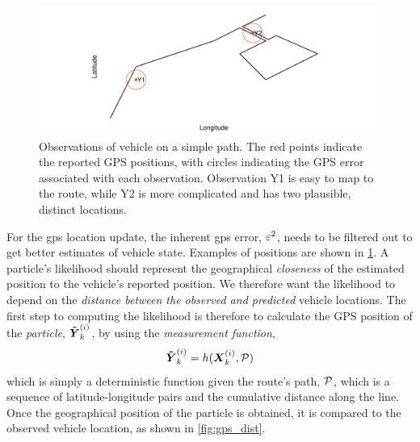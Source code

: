 \begin{knitrout}
\color{fgcolor}\begin{figure}
\includegraphics[width=\maxwidth]{figure/lhood_obs-1} \caption[Observations of vehicle on a simple path]{Observations of vehicle on a simple path. The red points indicate the reported GPS positions, with circles indicating the GPS error associated with each observation. Observation Y1 is easy to map to the route, while Y2 is more complicated and has two plausible, distinct locations.}\label{fig:lhood_obs}
\end{figure}


\end{knitrout}





For the \gls{gps} location update, the inherent \gls{gps} error, $\varepsilon^2$, needs to be filtered out to get better estimates of vehicle state. Examples of positions are shown in \cref{fig:lhood_obs}. A particle's likelihood should represent the geographical \emph{closeness} of the estimated position to the vehicle's reported position. We therefore want the likelihood to depend on the \emph{distance between the observed and predicted} vehicle locations. The first step to computing the likelihood is therefore
to calculate the GPS position of the \emph{particle}, $\boldsymbol{\tilde Y}^{(i)}_k$, by using the \emph{measurement function},
\begin{equation}
\label{eq:pf_measurement_fun}
\boldsymbol{\tilde Y}^{(i)}_k = h(\boldsymbol{X}^{(i)}_k, \mathcal{P})
\end{equation}
which is simply a deterministic function given the route's path, $\mathcal{P}$, which is a sequence of latitude-longitude pairs and the cumulative distance along the line. Once the geographical position of the particle is obtained, it is compared to the observed vehicle location, as shown in \cref{fig:gps_dist}.

